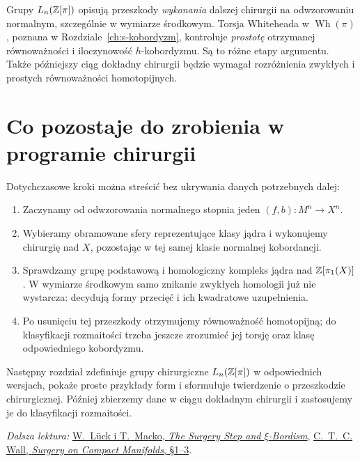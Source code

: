 \begin{uwaga}
Grupy $L_n(\mathbb{Z}[\pi])$ opisują przeszkody
\emph{wykonania} dalszej chirurgii na odwzorowaniu
normalnym, szczególnie w wymiarze środkowym.
Torsja Whiteheada w
$\operatorname{Wh}(\pi)$, poznana w
Rozdziale~\ref{ch:s-kobordyzm}, kontroluje
\emph{prostotę} otrzymanej równoważności
i iloczynowość $h$-kobordyzmu.
Są to różne etapy argumentu. Także późniejszy
ciąg dokładny chirurgii będzie wymagał
rozróżnienia zwykłych i prostych
równoważności homotopijnych.
\end{uwaga}

\section{Co pozostaje do zrobienia w programie chirurgii}
\label{sec:plan-chirurgia-21}

Dotychczasowe kroki można streścić bez
ukrywania danych potrzebnych dalej:
\begin{enumerate}[label=(\arabic*)]
\item Zaczynamy od odwzorowania normalnego
stopnia jeden $(f,b):M^n\to X^n$.
\item Wybieramy obramowane sfery reprezentujące
klasy jądra i wykonujemy chirurgię nad $X$,
pozostając w tej samej klasie normalnej kobordancji.
\item Sprawdzamy grupę podstawową i homologiczny
kompleks jądra nad $\mathbb{Z}[\pi_1(X)]$.
W wymiarze środkowym samo znikanie zwykłych
homologii już nie wystarcza: decydują formy
przecięć i ich kwadratowe uzupełnienia.
\item Po usunięciu tej przeszkody otrzymujemy
równoważność homotopijną; do klasyfikacji
rozmaitości trzeba jeszcze zrozumieć
jej torsję oraz klasę odpowiedniego
kobordyzmu.
\end{enumerate}

Następny rozdział zdefiniuje grupy chirurgiczne
$L_n(\mathbb{Z}[\pi])$ w odpowiednich wersjach,
pokaże proste przykłady form i sformułuje
twierdzenie o przeszkodzie chirurgicznej.
Później zbierzemy dane w ciągu dokładnym
chirurgii i zastosujemy je do klasyfikacji
rozmaitości.

\par\smallskip
{\footnotesize\noindent\emph{Dalsza lektura:}
\href{https://link.springer.com/chapter/10.1007/978-3-031-56334-8_4}
{W.~Lück i T.~Macko, \emph{The Surgery Step and $\xi$-Bordism}},
\href{https://webhomes.maths.ed.ac.uk/~v1ranick/books/scm.pdf}
{C.~T.~C. Wall, \emph{Surgery on Compact Manifolds}, §1--3}.\par}
